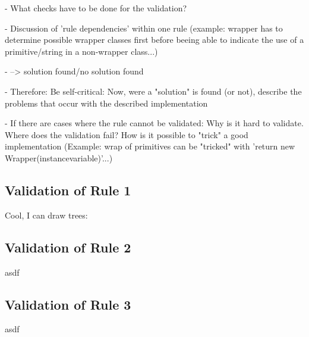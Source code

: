 - What checks have to be done for the validation?
 
 - Discussion of 'rule dependencies' within one rule (example: wrapper has to determine possible wrapper classes first before beeing able to indicate the use of a primitive/string in a non-wrapper class...)
 
  - --> solution found/no solution found
 
  - Therefore: Be self-critical: Now, were a "solution" is found (or not), describe the problems that occur with the described implementation
  
 - If there are cases where the rule cannot be validated: Why is it hard to validate. Where does the validation fail? How is it possible to "trick" a good implementation (Example: wrap of primitives can be "tricked" with 'return new Wrapper(instancevariable)'...) 

\subsection{Validation of Rule 1}
Cool, I can draw trees: 


\subsection{Validation of Rule 2}
asdf
\subsection{Validation of Rule 3}
asdf
